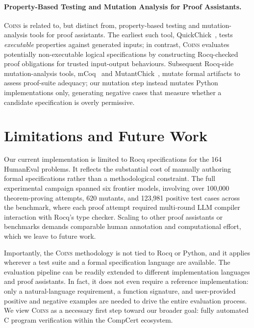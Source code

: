 \documentclass{article}
\theoremstyle{plain}
\theoremstyle{definition}
\theoremstyle{remark}
\begin{document}
\paragraph{Property-Based Testing and Mutation Analysis for Proof Assistants.}
\textsc{Coins} is related to, but distinct from, property-based testing and mutation-analysis tools for proof assistants. The earliest such tool, QuickChick~\cite{paraskevopoulou2015foundational}, tests \emph{executable} properties against generated inputs; in contrast, \textsc{Coins} evaluates potentially non-executable logical specifications by constructing Rocq-checked proof obligations for trusted input-output behaviours. Subsequent Rocq-side mutation-analysis tools, mCoq~\cite{celik2019mutation} and MutantChick~\cite{cavada2020mutantchick}, mutate formal artifacts to assess proof-suite adequacy; our mutation step instead mutates Python implementations only, generating negative cases that measure whether a candidate specification is overly permissive.



\section{Limitations and Future Work}
Our current implementation is limited to Rocq specifications for the 164 HumanEval problems. It reflects the substantial cost of manually authoring formal specifications rather than a methodological constraint. The full experimental campaign spanned six frontier models, involving over 100{,}000 theorem-proving attempts, 620 mutants, and 123{,}981 positive test cases across the benchmark, where each proof attempt required multi-round LLM compiler interaction with Rocq's type checker. Scaling to other proof assistants or benchmarks demands comparable human annotation and computational effort, which we leave to future work.

Importantly, the \textsc{Coins} methodology is not tied to Rocq or Python, and it applies wherever a test suite and a formal specification language are available. The evaluation pipeline can be readily extended to different implementation languages and proof assistants. In fact, it does not even require a reference implementation: only a natural-language requirement, a function signature, and user-provided positive and negative examples are needed to drive the entire evaluation process. We view \textsc{Coins} as a necessary first step toward our broader goal: fully automated C program verification within the CompCert ecosystem.
\end{document}
